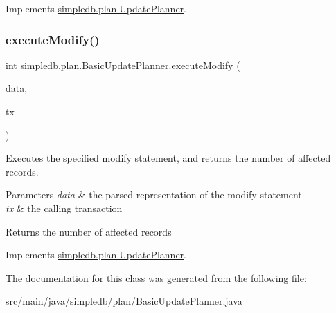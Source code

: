 Implements \hyperlink{interfacesimpledb_1_1plan_1_1UpdatePlanner_a6f2cfe8428b2c5f61204b8606905100e}{simpledb.\+plan.\+Update\+Planner}.

\mbox{\label{classsimpledb_1_1plan_1_1BasicUpdatePlanner_a938959eb04b3f6079876760e67b4627f}} 
\subsubsection{\texorpdfstring{execute\+Modify()}{executeModify()}}
{\footnotesize\ttfamily int simpledb.\+plan.\+Basic\+Update\+Planner.\+execute\+Modify (\begin{DoxyParamCaption}\item[{\hyperlink{classsimpledb_1_1parse_1_1ModifyData}{Modify\+Data}}]{data,  }\item[{\hyperlink{classsimpledb_1_1tx_1_1Transaction}{Transaction}}]{tx }\end{DoxyParamCaption})\hspace{0.3cm}{\ttfamily [inline]}}

Executes the specified modify statement, and returns the number of affected records. 
\begin{DoxyParams}{Parameters}
{\em data} & the parsed representation of the modify statement \\
\hline
{\em tx} & the calling transaction \\
\hline
\end{DoxyParams}
\begin{DoxyReturn}{Returns}
the number of affected records 
\end{DoxyReturn}


Implements \hyperlink{interfacesimpledb_1_1plan_1_1UpdatePlanner_af887ff3fe178adb4fc3b3bee98acde73}{simpledb.\+plan.\+Update\+Planner}.



The documentation for this class was generated from the following file\+:\begin{DoxyCompactItemize}
\item 
src/main/java/simpledb/plan/Basic\+Update\+Planner.\+java\end{DoxyCompactItemize}
